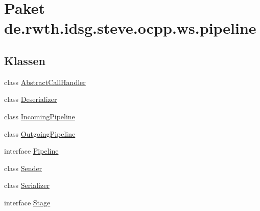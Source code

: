 \hypertarget{namespacede_1_1rwth_1_1idsg_1_1steve_1_1ocpp_1_1ws_1_1pipeline}{\section{Paket de.\+rwth.\+idsg.\+steve.\+ocpp.\+ws.\+pipeline}
\label{namespacede_1_1rwth_1_1idsg_1_1steve_1_1ocpp_1_1ws_1_1pipeline}
}
\subsection*{Klassen}
\begin{DoxyCompactItemize}
\item 
class \hyperlink{classde_1_1rwth_1_1idsg_1_1steve_1_1ocpp_1_1ws_1_1pipeline_1_1_abstract_call_handler}{Abstract\+Call\+Handler}
\item 
class \hyperlink{classde_1_1rwth_1_1idsg_1_1steve_1_1ocpp_1_1ws_1_1pipeline_1_1_deserializer}{Deserializer}
\item 
class \hyperlink{classde_1_1rwth_1_1idsg_1_1steve_1_1ocpp_1_1ws_1_1pipeline_1_1_incoming_pipeline}{Incoming\+Pipeline}
\item 
class \hyperlink{classde_1_1rwth_1_1idsg_1_1steve_1_1ocpp_1_1ws_1_1pipeline_1_1_outgoing_pipeline}{Outgoing\+Pipeline}
\item 
interface \hyperlink{interfacede_1_1rwth_1_1idsg_1_1steve_1_1ocpp_1_1ws_1_1pipeline_1_1_pipeline}{Pipeline}
\item 
class \hyperlink{classde_1_1rwth_1_1idsg_1_1steve_1_1ocpp_1_1ws_1_1pipeline_1_1_sender}{Sender}
\item 
class \hyperlink{classde_1_1rwth_1_1idsg_1_1steve_1_1ocpp_1_1ws_1_1pipeline_1_1_serializer}{Serializer}
\item 
interface \hyperlink{interfacede_1_1rwth_1_1idsg_1_1steve_1_1ocpp_1_1ws_1_1pipeline_1_1_stage}{Stage}
\end{DoxyCompactItemize}
